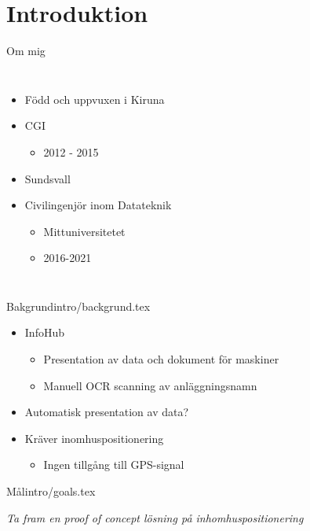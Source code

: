 \section{Introduktion}


\begin{frame}{Om mig}
	\begin{columns}[T, onlytextwidth]
		\begin{itemize}
			\item Född och uppvuxen i Kiruna

			\item CGI
				\begin{itemize}
					\item 2012 - 2015
				\end{itemize}
			
			\item Sundsvall	
			\item Civilingenjör inom Datateknik
				\begin{itemize}
					\item Mittuniversitetet
					\item 2016-2021
				\end{itemize}
			
		\end{itemize}
	
	
	\end{columns}
\end{frame}


\begin{notedFrame}{Bakgrund}{intro/backgrund.tex}
	\begin{itemize}
		\item InfoHub
			\begin{itemize}
				\item Presentation av data och dokument för maskiner
				\item Manuell OCR scanning av anläggningsnamn
			\end{itemize}

		\item Automatisk presentation av data?
		\item Kräver inomhuspositionering
			\begin{itemize}
				\item Ingen tillgång till GPS-signal
			\end{itemize}
	\end{itemize}
\end{notedFrame}


\begin{notedFrame}{Mål}{intro/goals.tex}
	\begin{block}{}
		\textit{Ta fram en proof of concept lösning på inhomhuspositionering}
	\end{block}
\end{notedFrame}


